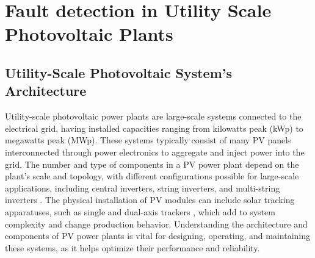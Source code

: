 \chapter{Fault detection in Utility Scale Photovoltaic Plants} \label{chap:chap2}


\section{Utility-Scale Photovoltaic System's Architecture}

Utility-scale photovoltaic power plants are large-scale systems connected to the electrical grid, having installed capacities ranging from kilowatts peak (kWp) to megawatts peak (MWp). These systems typically consist of many PV panels interconnected through power electronics to aggregate and inject power into the grid. The number and type of components in a PV power plant depend on the plant's scale and topology, with different configurations possible for large-scale applications, including central inverters, string inverters, and multi-string inverters \cite{lspv}. The physical installation of PV modules can include solar tracking apparatuses, such as single and dual-axis trackers \cite{Mourad2022}, which add to system complexity and change production behavior. Understanding the architecture and components of PV power plants is vital for designing, operating, and maintaining these systems, as it helps optimize their performance and reliability.

